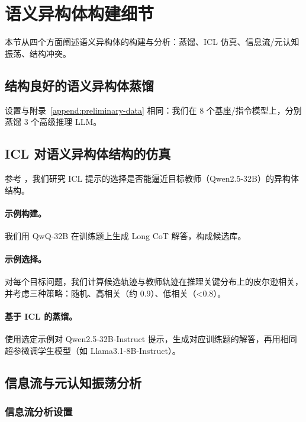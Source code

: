 \section{语义异构体构建细节}
\label{sec:appendix_isomers}
本节从四个方面阐述语义异构体的构建与分析：蒸馏、ICL 仿真、信息流/元认知振荡、结构冲突。

\subsection{结构良好的语义异构体蒸馏}
设置与附录~\ref{append:preliminary-data} 相同：我们在 8 个基座/指令模型上，分别蒸馏 3 个高级推理 LLM。

\subsection{ICL 对语义异构体结构的仿真}
\label{sec:appendix_icl}
参考 \citet{dong2024survey}，我们研究 ICL 提示的选择是否能逼近目标教师（Qwen2.5-32B）的异构体结构。\vspace{-5pt}

\paragraph{示例构建。}
我们用 QwQ-32B 在训练题上生成 Long CoT 解答，构成候选库。\vspace{-5pt}

\paragraph{示例选择。}
对每个目标问题，我们计算候选轨迹与教师轨迹在推理关键分布上的皮尔逊相关，并考虑三种策略：随机、高相关（约 0.9）、低相关（<0.8）。\vspace{-5pt}

\paragraph{基于 ICL 的蒸馏。}
使用选定示例对 Qwen2.5-32B-Instruct 提示，生成对应训练题的解答，再用相同超参微调学生模型（如 Llama3.1-8B-Instruct）。

\subsection{信息流与元认知振荡分析}
\label{append:information}

\subsubsection{信息流分析设置}
